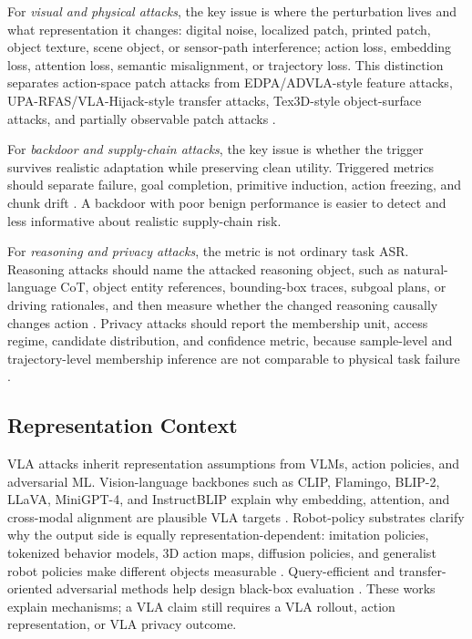 For \emph{visual and physical attacks}, the key issue is where the perturbation lives and what representation it changes: digital noise, localized patch, printed patch, object texture, scene object, or sensor-path interference; action loss, embedding loss, attention loss, semantic misalignment, or trajectory loss. This distinction separates action-space patch attacks from EDPA/ADVLA-style feature attacks, UPA-RFAS/VLA-Hijack-style transfer attacks, Tex3D-style object-surface attacks, and partially observable patch attacks \cite{wang2025vlaadversarial,xu2025edpa,zhang2025advla,lu2026patch,fu2026vlahijack,chen2026tex3d,wang2026partialpatch}.

For \emph{backdoor and supply-chain attacks}, the key issue is whether the trigger survives realistic adaptation while preserving clean utility. Triggered metrics should separate failure, goal completion, primitive induction, action freezing, and chunk drift \cite{zhou2025badvla,zhou2025goba,xu2025dropvla,li2025attackvla,wang2025freezevla,xu2026silentdrift}. A backdoor with poor benign performance is easier to detect and less informative about realistic supply-chain risk.

For \emph{reasoning and privacy attacks}, the metric is not ordinary task ASR. Reasoning attacks should name the attacked reasoning object, such as natural-language CoT, object entity references, bounding-box traces, subgoal plans, or driving rationales, and then measure whether the changed reasoning causally changes action \cite{huang2026trap,altered2026thoughts,teymoorianfard2026reasonbreak}. Privacy attacks should report the membership unit, access regime, candidate distribution, and confidence metric, because sample-level and trajectory-level membership inference are not comparable to physical task failure \cite{peng2026miavla,luan2026vlaleaks}.

\subsection{Representation Context}

VLA attacks inherit representation assumptions from VLMs, action policies, and adversarial ML. Vision-language backbones such as CLIP, Flamingo, BLIP-2, LLaVA, MiniGPT-4, and InstructBLIP explain why embedding, attention, and cross-modal alignment are plausible VLA targets \cite{radford2021clip,alayrac2022flamingo,li2023blip2,liu2023llava,zhu2023minigpt4,dai2023instructblip}. Robot-policy substrates clarify why the output side is equally representation-dependent: imitation policies, tokenized behavior models, 3D action maps, diffusion policies, and generalist robot policies make different objects measurable \cite{florence2021implicit,shafiullah2022bet,lee2024vqbet,zeng2020transporter,chi2023diffusion} \cite{ghosh2024octo,bousmalis2023robocat,black2024pi0,liu2024rdt}. Query-efficient and transfer-oriented adversarial methods help design black-box evaluation \cite{papernot2017practical,tramer2018ensemble,chen2017zoo,brendel2018decision,ilyas2018blackbox} \cite{li2019nattack,andriushchenko2020square,croce2020autoattack,dong2018momentum}. These works explain mechanisms; a VLA claim still requires a VLA rollout, action representation, or VLA privacy outcome.

